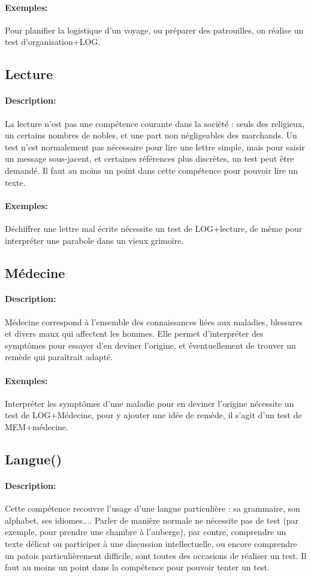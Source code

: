 \documentclass[10pt,a4paper,twocolumn]{book}
\begin{document}
\paragraph{Exemples:}Pour planifier la logistique d'un voyage, ou préparer des patrouilles, on réalise un test d'organisation+LOG.
\subsection{Lecture}
\paragraph{Description:}La lecture n'est pas une compétence courante dans la société : seuls des religieux, un certains nombres de nobles, et une part non négligeables des marchands. Un test n'est normalement pas nécessaire pour lire une lettre simple, mais pour saisir un message sous-jacent, et certaines références plus discrètes, un test peut être demandé. Il faut au moins un point dans cette compétence pour pouvoir lire un texte.
\paragraph{Exemples:}Déchiffrer une lettre mal écrite nécessite un test de LOG+lecture, de même pour interpréter une parabole dans un vieux grimoire.
\subsection{Médecine}
\paragraph{Description:}Médecine correspond à l'ensemble des connaissances liées aux maladies, blessures et divers maux qui affectent les hommes. Elle permet d'interpréter des symptômes pour essayer d'en deviner l'origine, et éventuellement de trouver un remède qui paraîtrait adapté.
\paragraph{Exemples:}Interpréter les symptômes d'une maladie pour en deviner l'origine nécessite un test de LOG+Médecine, pour y ajouter une idée de remède, il s'agit d'un test de MEM+médecine.
\subsection{Langue()}
\paragraph{Description:}Cette compétence recouvre l'usage d'une langue particulière : sa grammaire, son alphabet, ses idiomes.... Parler de manière normale ne nécessite pas de test (par exemple, pour prendre une chambre à l'auberge), par contre, comprendre un texte délicat ou participer à une discussion intellectuelle, ou encore comprendre un patois particulièrement difficile, sont toutes des occasions de réaliser un test. Il faut au moins un point dans la compétence pour pouvoir tenter un test.
\end{document}
